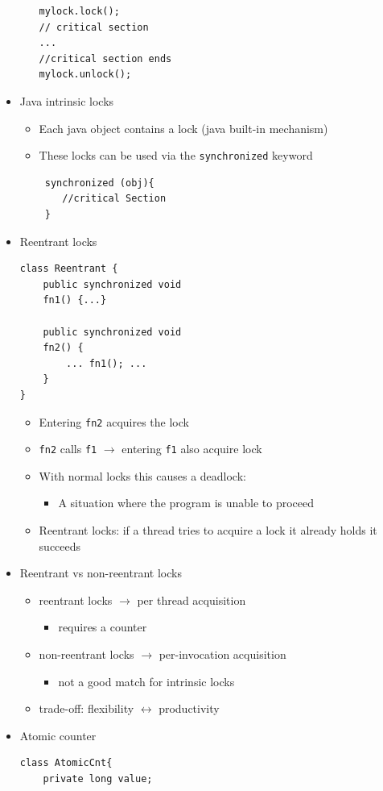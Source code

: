 \documentclass[a4paper]{article}
\newcommand{\inline}[1]{\lstinline!#1!}%
\begin{document}
\begin{itemize}
\begin{itemize}
\begin{lstlisting}
mylock.lock();
// critical section
...
//critical section ends
mylock.unlock();
\end{lstlisting}
 				\end{itemize}
 			\item Java intrinsic locks
 				\begin{itemize}
 					\item Each java object contains a lock (java built-in mechanism)
 					\item These locks can be used via the \inline{synchronized} keyword
 					\begin{lstlisting}
 synchronized (obj){
 	//critical Section
 }
 					\end{lstlisting}
 				\end{itemize}
 			\item Reentrant locks
 \begin{lstlisting}
class Reentrant {
	public synchronized void
	fn1() {...}

	public synchronized void
	fn2() {
		... fn1(); ...
	}
}
 \end{lstlisting}
 				\begin{itemize}
 					\item Entering \inline{fn2} acquires the lock 
 					\item \inline{fn2} calls \inline{f1} $\to$ entering \inline{f1} also acquire lock
 					\item With normal locks this causes a deadlock:
 						\begin{itemize}
 							\item A situation where the program is unable to proceed
 						\end{itemize}
 					\item Reentrant locks: if a thread tries to acquire a lock it already holds it succeeds
 				\end{itemize}
 			\item Reentrant vs non-reentrant locks
 				\begin{itemize}
 					\item reentrant locks $\to$ per thread acquisition
 						\begin{itemize}
 							\item requires a counter
 						\end{itemize}
 					\item non-reentrant locks $\to$ per-invocation acquisition
 						\begin{itemize}
 							\item not a good match for intrinsic locks
 						\end{itemize}
 					\item trade-off: flexibility $\leftrightarrow$ productivity 
 				\end{itemize}
 			\item Atomic counter
 			\begin{lstlisting}
class AtomicCnt{
	private long value;


\end{lstlisting}
\end{itemize}
\end{document}
